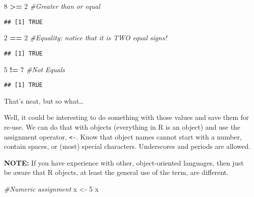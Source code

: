 \documentclass[]{article}
\newenvironment{Shaded}{\begin{snugshade}}{\end{snugshade}}
\newcommand{\CommentTok}[1]{\textcolor[rgb]{0.56,0.35,0.01}{\textit{#1}}}
\newcommand{\DecValTok}[1]{\textcolor[rgb]{0.00,0.00,0.81}{#1}}
\newcommand{\NormalTok}[1]{#1}
\newcommand{\OperatorTok}[1]{\textcolor[rgb]{0.81,0.36,0.00}{\textbf{#1}}}
\newcommand{\StringTok}[1]{\textcolor[rgb]{0.31,0.60,0.02}{#1}}
\begin{document}
\begin{Shaded}
\begin{Highlighting}[]
\DecValTok{8} \OperatorTok{>=}\StringTok{ }\DecValTok{2} \CommentTok{#Greater than or equal}
\end{Highlighting}
\end{Shaded}

\begin{verbatim}
## [1] TRUE
\end{verbatim}

\begin{Shaded}
\begin{Highlighting}[]
\DecValTok{2} \OperatorTok{==}\StringTok{ }\DecValTok{2} \CommentTok{#Equality: notice that it is TWO equal signs!}
\end{Highlighting}
\end{Shaded}

\begin{verbatim}
## [1] TRUE
\end{verbatim}

\begin{Shaded}
\begin{Highlighting}[]
\DecValTok{5} \OperatorTok{!=}\StringTok{ }\DecValTok{7} \CommentTok{#Not Equals}
\end{Highlighting}
\end{Shaded}

\begin{verbatim}
## [1] TRUE
\end{verbatim}

That's neat, but so what\ldots{}

Well, it could be interesting to do something with those values and save
them for re-use. We can do that with objects (everything in R is an
object) and use the assignment operator, \texttt{\textless{}-}. Know
that object names cannot start with a number, contain spaces, or (most)
special characters. Underscores and periods are allowed.

\textbf{NOTE:} If you have experience with other, object-oriented
languages, then just be aware that R objects, at least the general use
of the term, are different.

\begin{Shaded}
\begin{Highlighting}[]
\CommentTok{#Numeric assignment}
\NormalTok{x <-}\StringTok{ }\DecValTok{5}
\NormalTok{x}
\end{Highlighting}
\end{Shaded}
\end{document}
